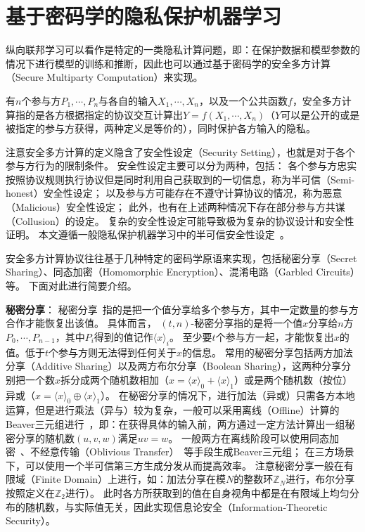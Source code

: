 \section{基于密码学的隐私保护机器学习}
纵向联邦学习可以看作是特定的一类隐私计算问题，即：在保护数据和模型参数的情况下进行模型的训练和推断，因此也可以通过基于密码学的安全多方计算（Secure Multiparty Computation）来实现。

\begin{definition}[安全多方计算]
    有$n$个参与方$P_1, \cdots, P_n$与各自的输入$X_1, \cdots, X_n$，以及一个公共函数$f$，安全多方计算指的是各方根据指定的协议交互计算出$Y= f(X_1, \cdots, X_n)$（$Y$可以是公开的或是被指定的参与方获得，两种定义是等价的），同时保护各方输入的隐私。
\end{definition}

注意安全多方计算的定义隐含了安全性设定（Security Setting），也就是对于各个参与方行为的限制条件。
安全性设定主要可以分为两种，包括：
各个参与方忠实按照协议规则执行协议但是同时利用自己获取到的一切信息，称为半可信（Semi-honest）安全性设定；
以及参与方可能存在不遵守计算协议的情况，称为恶意（Malicious）安全性设定；
此外，也有在上述两种情况下存在部分参与方共谋（Collusion）的设定。
%
复杂的安全性设定可能导致极为复杂的协议设计和安全性证明。
%
本文遵循一般隐私保护机器学习中的半可信安全性设定~\cite{wagh2019securenn,mohassel2018aby3,riazi_2018_chameleon}。
%
%


安全多方计算协议往往基于几种特定的密码学原语来实现，包括秘密分享（Secret Sharing）、同态加密（Homomorphic Encryption）、混淆电路（Garbled Circuits）等。
%
下面对此进行简要介绍。
%


\textbf{秘密分享}：
秘密分享~\cite{shamir1979share}指的是把一个值分享给多个参与方，其中一定数量的参与方合作才能恢复出该值。
%
具体而言，
%
$(t,n)$-秘密分享指的是将一个值$x$分享给$n$方$P_0, \cdots, P_{n-1}$，其中$P_i$得到的值记作$\langle x \rangle_i$。
%
至少要$t$个参与方一起，才能恢复出$x$的值。低于$t$个参与方则无法得到任何关于$x$的信息。
%
常用的秘密分享包括两方加法分享（Additive Sharing）以及两方布尔分享（Boolean Sharing），这两种分享分别把一个数$x$拆分成两个随机数相加（$x = \langle x \rangle_0 + \langle x \rangle_1$）或是两个随机数（按位）异或（$x = \langle x \rangle_0 \oplus \langle x \rangle_1$）。
%
在秘密分享的情况下，进行加法（异或）只需各方本地运算，但是进行乘法（异与）较为复杂，一般可以采用离线（Offline）计算的Beaver三元组进行~\cite{beaver1992efficient}，即：在获得具体的输入前，两方通过一定方法计算出一组秘密分享的随机数$(u,v,w)$满足$uv = w$。
%
一般两方在离线阶段可以使用同态加密~\cite{paillier1999,gentry2009fully}、不经意传输（Oblivious Transfer）~\cite{yadav_2022_ot_survey}等手段生成Beaver三元组；
在三方场景下，可以使用一个半可信第三方生成分发从而提高效率。
%
注意秘密分享一般在有限域（Finite Domain）上进行，如：加法分享在模$N$的整数环$\mathbb Z_N$进行，布尔分享按照定义在$\mathbb Z_2$进行）。
%
此时各方所获取到的值在自身视角中都是在有限域上均匀分布的随机数，与实际值无关，因此实现信息论安全（Information-Theoretic Security）。



